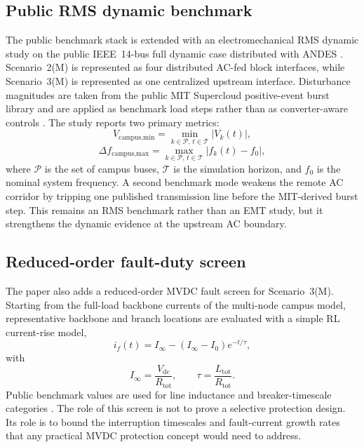 \documentclass[11pt]{article}
\begin{document}
\subsection{Public RMS dynamic benchmark}
The public benchmark stack is extended with an electromechanical RMS dynamic study on the public IEEE~14-bus full dynamic case distributed with ANDES \cite{Cui2021ANDES}. Scenario~2(M) is represented as four distributed AC-fed block interfaces, while Scenario~3(M) is represented as one centralized upstream interface. Disturbance magnitudes are taken from the public MIT Supercloud positive-event burst library and are applied as benchmark load steps rather than as converter-aware controls \cite{MITSupercloud2021}. The study reports two primary metrics:
\begin{equation}
V_{\text{campus,min}} = \min_{k \in \mathcal{P},\, t \in \mathcal{T}} |V_k(t)|,
\end{equation}
\begin{equation}
\Delta f_{\text{campus,max}} = \max_{k \in \mathcal{P},\, t \in \mathcal{T}} \left| f_k(t) - f_0 \right|,
\end{equation}
where $\mathcal{P}$ is the set of campus buses, $\mathcal{T}$ is the simulation horizon, and $f_0$ is the nominal system frequency. A second benchmark mode weakens the remote AC corridor by tripping one published transmission line before the MIT-derived burst step. This remains an RMS benchmark rather than an EMT study, but it strengthens the dynamic evidence at the upstream AC boundary.

\subsection{Reduced-order fault-duty screen}
The paper also adds a reduced-order MVDC fault screen for Scenario~3(M). Starting from the full-load backbone currents of the multi-node campus model, representative backbone and branch locations are evaluated with a simple RL current-rise model,
\begin{equation}
i_f(t) = I_{\infty} - \left(I_{\infty} - I_0\right)e^{-t/\tau},
\end{equation}
with
\begin{equation}
I_{\infty} = \frac{V_{\text{dc}}}{R_{\text{tot}}}, \qquad \tau = \frac{L_{\text{tot}}}{R_{\text{tot}}}.
\end{equation}
Public benchmark values are used for line inductance and breaker-timescale categories \cite{Wang2024ShortCircuit,Taherzadeh2023DCCB}. The role of this screen is not to prove a selective protection design. Its role is to bound the interruption timescales and fault-current growth rates that any practical MVDC protection concept would need to address.
\end{document}
